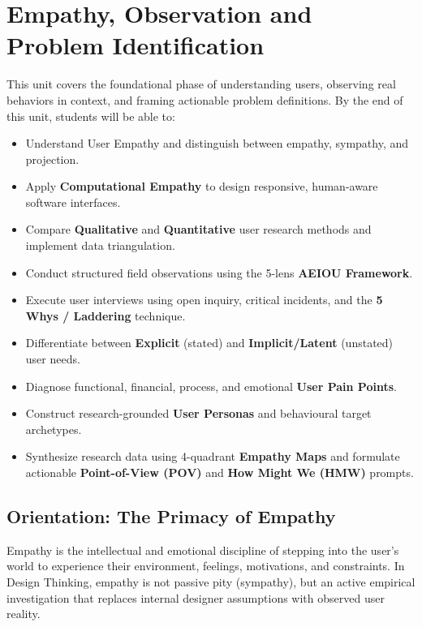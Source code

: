 \chapter{Empathy, Observation and Problem Identification}
\label{chap:empathy_observation}

\begin{tcolorbox}[enhanced, colback=boxnavybg, colframe=brandnavy, boxrule=1.2pt, arc=4pt, title={\Large\bfseries\sffamily Unit 2 Overview \& Learning Objectives}]
\sffamily\normalsize
This unit covers the foundational phase of understanding users, observing real behaviors in context, and framing actionable problem definitions. By the end of this unit, students will be able to:
\begin{itemize}[leftmargin=1.2em, itemsep=2pt, topsep=3pt]
    \item Understand User Empathy and distinguish between empathy, sympathy, and projection.
    \item Apply \textbf{Computational Empathy} to design responsive, human-aware software interfaces.
    \item Compare \textbf{Qualitative} and \textbf{Quantitative} user research methods and implement data triangulation.
    \item Conduct structured field observations using the 5-lens \textbf{AEIOU Framework}.
    \item Execute user interviews using open inquiry, critical incidents, and the \textbf{5 Whys / Laddering} technique.
    \item Differentiate between \textbf{Explicit} (stated) and \textbf{Implicit/Latent} (unstated) user needs.
    \item Diagnose functional, financial, process, and emotional \textbf{User Pain Points}.
    \item Construct research-grounded \textbf{User Personas} and behavioural target archetypes.
    \item Synthesize research data using 4-quadrant \textbf{Empathy Maps} and formulate actionable \textbf{Point-of-View (POV)} and \textbf{How Might We (HMW)} prompts.
\end{itemize}
\end{tcolorbox}

\section{Orientation: The Primacy of Empathy}

Empathy is the intellectual and emotional discipline of stepping into the user's world to experience their environment, feelings, motivations, and constraints. In Design Thinking, empathy is not passive pity (sympathy), but an active empirical investigation that replaces internal designer assumptions with observed user reality.

